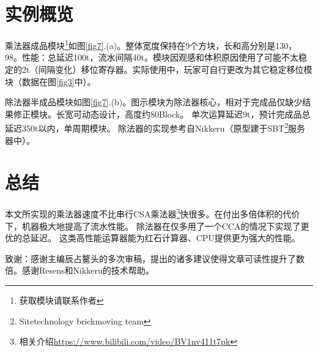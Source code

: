 \documentclass[UTF8,12pt,punct=kaiming,fontset=none]{article}
\begin{document}
    \section{实例概览}

    乘法器成品模块\footnote{获取模块请联系作者}如图\ref{fig7}.(a)。整体宽度保持在9个方块，长和高分别是130，98。性能：总延迟100t，流水间隔40t。模块因观感和体积原因使用了可能不太稳定的2t（间隔变化）移位寄存器。实际使用中，玩家可自行更改为其它稳定移位模块（数据在图\ref{fig3}中）。

    除法器半成品模块如图\ref{fig7}.(b)。图示模块为除法器核心，相对于完成品仅缺少结果修正模块。长宽可动态设计，高度约80Block。
    单次运算延迟9t，预计完成品总延迟350t以内，单周期模块。
    除法器的实现参考自Nikkeru（原型建于SBT\footnote{Sitetechnology brickmoving team}服务器中）。

    \section{总结}
    本文所实现的乘法器速度不比串行CSA乘法器\footnote{相关介绍\url{https://www.bilibili.com/video/BV1nv411t7pk}}快很多。在付出多倍体积的代价下，机器极大地提高了流水性能。
    除法器在仅多用了一个CCA的情况下实现了更优的总延迟。
    这类高性能运算器能为红石计算器、CPU提供更为强大的性能。
    \newline

    致谢：感谢主编辰占鳌头的多次审稿，提出的诸多建议使得文章可读性提升了数倍。感谢Resens和Nikkeru的技术帮助。

    
    
\end{document}
